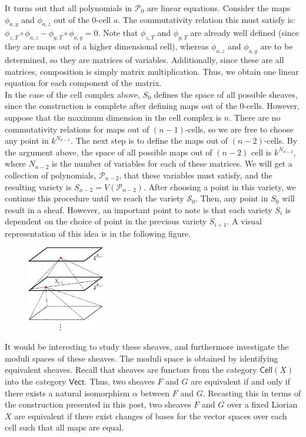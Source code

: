 \documentclass{article}
\newcommand{\cP}{\mathcal{P}}
\newcommand{\cS}{\mathcal{S}}
\theoremstyle{definition}
\begin{document}
It turns out that all polynomials in $\cP_0$ are linear equations. Consider the maps $\phi_{a,y}$ and $\phi_{a,z}$ out of the $0$-cell $a$. The commutativity relation this must satisfy is: $\phi_{z,T} \circ \phi_{a,z} - \phi_{y,T} \circ \phi_{a,y}  = 0$. Note that $\phi_{z,T}$ and $\phi_{y,T}$ are already well defined (since they are maps out of a higher dimensional cell), whereas $\phi_{a,z}$ and $\phi_{a,y}$ are to be determined, so they are matrices of variables. Additionally, since these are all matrices, composition is simply matrix multiplication. Thus, we obtain one linear equation for each component of the matrix.  \\

In the case of the cell complex above, $S_0$ defines the space of all possible sheaves, since the construction is complete after defining maps out of the $0$-cells. However, suppose that the maximum dimension in the cell complex is $n$. There are no commutativity relations for maps out of $(n-1)$-cells, so we are free to choose any point in $k^{N_{n-1}}$. The next step is to define the maps out of $(n-2)$-cells. By the argument above, the space of all possible maps out of $(n-2)$ cell is $k^{N_{n-2}}$, where $N_{n-2}$ is the number of variables for each of these matrices. We will get a collection of polynomials, $\cP_{n-2}$, that these variables must satisfy, and the resulting variety is $S_{n-2} = V(\cP_{n-2})$. After choosing a point in this variety, we continue this procedure until we reach the variety $\cS_0$. Then, any point in $S_0$ will result in a sheaf. However, an important point to note is that each variety $S_i$ is dependent on the choice of point in the previous variety $S_{i+1}$. A visual representation of this idea is in the following figure. 

\begin{figure}[!htbp]
\centering
	\includegraphics[width=0.3\textwidth]{images/variety2_fixed.eps}
\end{figure}


It would be interesting to study these sheaves, and furthermore investigate the moduli spaces of these sheaves. The moduli space is obtained by identifying equivalent sheaves. Recall that sheaves are functors from the category $\textsf{Cell}(X)$ into the category $\textsf{Vect}$. Thus, two sheaves $F$ and $G$ are equivalent if and only if there exists a natural isomorphism $\alpha$ between $F$ and $G$. Recasting this in terms of the construction presented in this post, two sheaves $F$ and $G$ over a fixed Liorian $X$ are equivalent if there exist changes of bases for the vector spaces over each cell such that all maps are equal.\\
\end{document}
